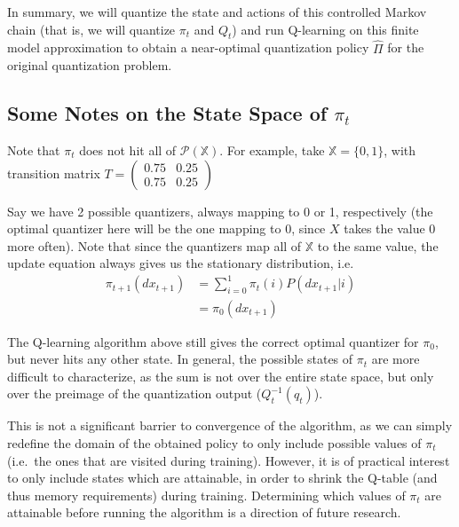 \documentclass{article}
\begin{document}
In summary, we will quantize the state and actions of this controlled Markov chain (that is, we will quantize \( \pi_t \) and \( Q_t \)) and run Q-learning on this finite model approximation to obtain a near-optimal quantization policy \( \hat{\Pi} \) for the original quantization problem.

\subsection{Some Notes on the State Space of \( \pi_t \)}\label{state space}
Note that \( \pi_t \) does not hit all of \( \mathcal{P}(\mathbb{X}) \). For example, take \( \mathbb{X} = \{0, 1\} \), with transition matrix \( T = \begin{pmatrix}
    0.75 & 0.25 \\
    0.75 & 0.25
\end{pmatrix}
\)

Say we have 2 possible quantizers, always mapping to 0 or 1, respectively (the optimal quantizer here will be the one mapping to 0, since \( X \) takes the value 0 more often). Note that since the quantizers map all of \( \mathbb{X} \) to the same value, the update equation always gives us the stationary distribution, i.e.
\begin{equation*}
    \begin{split}
        \pi_{t+1}(dx_{t+1}) & = \sum_{i=0}^1\pi_t(i)P(dx_{t+1}|i) \\
        & = \pi_0(dx_{t+1})
    \end{split}
\end{equation*}

The Q-learning algorithm above still gives the correct optimal quantizer for \( \pi_0 \), but never hits any other state. In general, the possible states of \( \pi_t \) are more difficult to characterize, as the sum is not over the entire state space, but only over the preimage of the quantization output (\( Q_t^{-1}(q_t) \)).

This is not a significant barrier to convergence of the algorithm, as we can simply redefine the domain of the obtained policy to only include possible values of \( \pi_t \) (i.e.\ the ones that are visited during training). However, it is of practical interest to only include states which are attainable, in order to shrink the Q-table (and thus memory requirements) during training. Determining which values of \( \pi_t \) are attainable before running the algorithm is a direction of future research.

\end{document}
